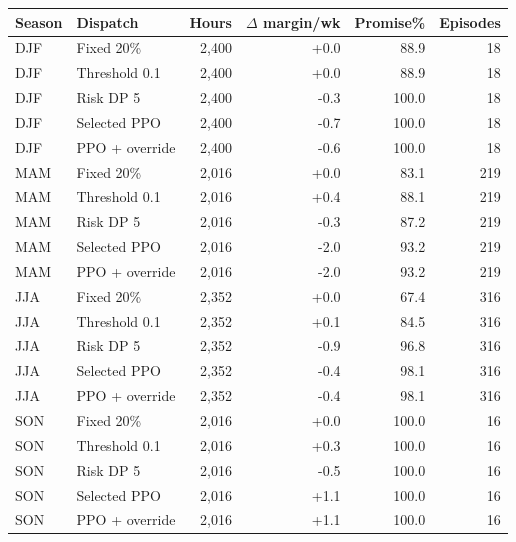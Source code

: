 \begin{tabular}{llrrrr}
\toprule
Season & Dispatch & Hours & $\Delta$ margin/wk & Promise\% & Episodes \\
\midrule
DJF & Fixed 20\% & 2,400 & +0.0 & 88.9 & 18 \\
DJF & Threshold 0.1 & 2,400 & +0.0 & 88.9 & 18 \\
DJF & Risk DP 5 & 2,400 & -0.3 & 100.0 & 18 \\
DJF & Selected PPO & 2,400 & -0.7 & 100.0 & 18 \\
DJF & PPO + override & 2,400 & -0.6 & 100.0 & 18 \\
MAM & Fixed 20\% & 2,016 & +0.0 & 83.1 & 219 \\
MAM & Threshold 0.1 & 2,016 & +0.4 & 88.1 & 219 \\
MAM & Risk DP 5 & 2,016 & -0.3 & 87.2 & 219 \\
MAM & Selected PPO & 2,016 & -2.0 & 93.2 & 219 \\
MAM & PPO + override & 2,016 & -2.0 & 93.2 & 219 \\
JJA & Fixed 20\% & 2,352 & +0.0 & 67.4 & 316 \\
JJA & Threshold 0.1 & 2,352 & +0.1 & 84.5 & 316 \\
JJA & Risk DP 5 & 2,352 & -0.9 & 96.8 & 316 \\
JJA & Selected PPO & 2,352 & -0.4 & 98.1 & 316 \\
JJA & PPO + override & 2,352 & -0.4 & 98.1 & 316 \\
SON & Fixed 20\% & 2,016 & +0.0 & 100.0 & 16 \\
SON & Threshold 0.1 & 2,016 & +0.3 & 100.0 & 16 \\
SON & Risk DP 5 & 2,016 & -0.5 & 100.0 & 16 \\
SON & Selected PPO & 2,016 & +1.1 & 100.0 & 16 \\
SON & PPO + override & 2,016 & +1.1 & 100.0 & 16 \\
\bottomrule
\end{tabular}
